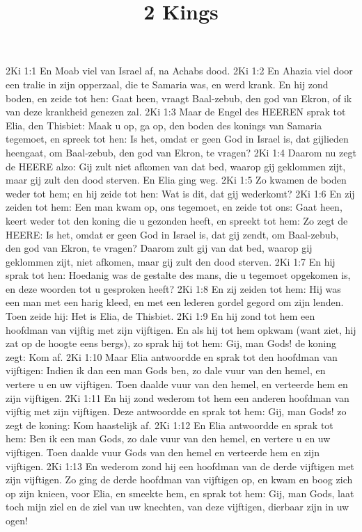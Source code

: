 

\title{2 Kings}


2Ki 1:1  En Moab viel van Israel af, na Achabs dood.
2Ki 1:2  En Ahazia viel door een tralie in zijn opperzaal, die te Samaria was, en werd krank. En hij zond boden, en zeide tot hen: Gaat heen, vraagt Baal-zebub, den god van Ekron, of ik van deze krankheid genezen zal.
2Ki 1:3  Maar de Engel des HEEREN sprak tot Elia, den Thisbiet: Maak u op, ga op, den boden des konings van Samaria tegemoet, en spreek tot hen: Is het, omdat er geen God in Israel is, dat gijlieden heengaat, om Baal-zebub, den god van Ekron, te vragen?
2Ki 1:4  Daarom nu zegt de HEERE alzo: Gij zult niet afkomen van dat bed, waarop gij geklommen zijt, maar gij zult den dood sterven. En Elia ging weg.
2Ki 1:5  Zo kwamen de boden weder tot hem; en hij zeide tot hen: Wat is dit, dat gij wederkomt?
2Ki 1:6  En zij zeiden tot hem: Een man kwam op, ons tegemoet, en zeide tot ons: Gaat heen, keert weder tot den koning die u gezonden heeft, en spreekt tot hem: Zo zegt de HEERE: Is het, omdat er geen God in Israel is, dat gij zendt, om Baal-zebub, den god van Ekron, te vragen? Daarom zult gij van dat bed, waarop gij geklommen zijt, niet afkomen, maar gij zult den dood sterven.
2Ki 1:7  En hij sprak tot hen: Hoedanig was de gestalte des mans, die u tegemoet opgekomen is, en deze woorden tot u gesproken heeft?
2Ki 1:8  En zij zeiden tot hem: Hij was een man met een harig kleed, en met een lederen gordel gegord om zijn lenden. Toen zeide hij: Het is Elia, de Thisbiet.
2Ki 1:9  En hij zond tot hem een hoofdman van vijftig met zijn vijftigen. En als hij tot hem opkwam (want ziet, hij zat op de hoogte eens bergs), zo sprak hij tot hem: Gij, man Gods! de koning zegt: Kom af.
2Ki 1:10  Maar Elia antwoordde en sprak tot den hoofdman van vijftigen: Indien ik dan een man Gods ben, zo dale vuur van den hemel, en vertere u en uw vijftigen. Toen daalde vuur van den hemel, en verteerde hem en zijn vijftigen.
2Ki 1:11  En hij zond wederom tot hem een anderen hoofdman van vijftig met zijn vijftigen. Deze antwoordde en sprak tot hem: Gij, man Gods! zo zegt de koning: Kom haastelijk af.
2Ki 1:12  En Elia antwoordde en sprak tot hem: Ben ik een man Gods, zo dale vuur van den hemel, en vertere u en uw vijftigen. Toen daalde vuur Gods van den hemel en verteerde hem en zijn vijftigen.
2Ki 1:13  En wederom zond hij een hoofdman van de derde vijftigen met zijn vijftigen. Zo ging de derde hoofdman van vijftigen op, en kwam en boog zich op zijn knieen, voor Elia, en smeekte hem, en sprak tot hem: Gij, man Gods, laat toch mijn ziel en de ziel van uw knechten, van deze vijftigen, dierbaar zijn in uw ogen!

